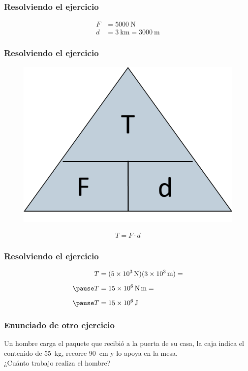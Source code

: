 \documentclass[14pt]{beamer}
\begin{document}
\begin{frame}
\frametitle{Resolviendo el ejercicio}
\pause
\begin{align*}
F &= \SI{5000}{\newton} \\[0.5em]
d &= \SI{3}{\kilo\meter} = \SI{3000}{\meter}
\end{align*}
\end{frame}
\begin{frame}
\frametitle{Resolviendo el ejercicio}
\begin{figure}
    \centering
    \includegraphics[scale=0.75]{Imagenes/Triangulo_Trabajo.png}
\end{figure}
\pause
\begin{align*}
T = F \cdot d
\end{align*}
\end{frame}
\begin{frame}
\frametitle{Resolviendo el ejercicio}
\begin{eqnarray*}
\begin{aligned}
T &= (\SI{5d3}{\newton})(\SI{3d3}{\meter}) = \\[0.5em] \pause 
T &= \SI{15d6}{\newton\meter} = \\[0.5em] \pause 
T &= \SI{15d6}{\joule} 
\end{aligned}
\end{eqnarray*}
\end{frame}
\begin{frame}
\frametitle{Enunciado de otro ejercicio}
Un hombre carga el paquete que recibió a la puerta de su casa, la caja indica el contenido de \SI{55}{\kilo\gram}, recorre \SI{90}{\centi\meter} y lo apoya en la mesa.
\\
\bigskip
\pause
¿Cuánto trabajo realiza el hombre?
\end{frame}
\end{document}
